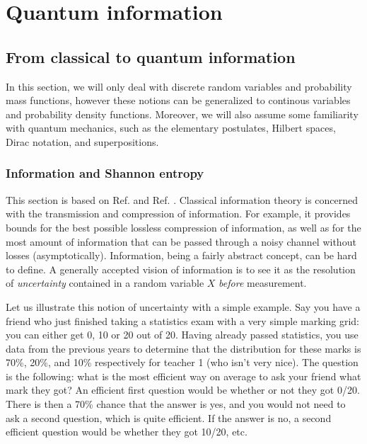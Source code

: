 \chapter{Quantum information} \label{chap:quantum_information}

\section{From classical to quantum information} \label{sec:classical_information}

In this section, we will only deal with discrete random variables and probability mass functions, however these notions can be generalized to continous variables and probability density functions. Moreover, we will also assume some familiarity with quantum mechanics, such as the elementary postulates, Hilbert spaces, Dirac notation, and superpositions.



\subsection{Information and Shannon entropy}

This section is based on Ref. \cite[pp. 1--56]{cover_elements_2006} and Ref. \cite[pp. 500--506]{nielsen_quantum_2010}. Classical information theory is concerned with the transmission and compression of information. For example, it provides bounds for the best possible lossless compression of information, as well as for the most amount of information that can be passed through a noisy channel without losses (asymptotically). Information, being a fairly abstract concept, can be hard to define. A generally accepted vision of information is to see it as the resolution of \textit{uncertainty} contained in a random variable $X$ \textit{before} measurement.

Let us illustrate this notion of uncertainty with a simple example. Say you have a friend who just finished taking a statistics exam with a very simple marking grid: you can either get 0, 10 or 20 out of 20. Having already passed statistics, you use data from the previous years to determine that the distribution for these marks is 70\%, 20\%, and 10\% respectively for teacher 1 (who isn't very nice). The question is the following: what is the most efficient way on average to ask your friend what mark they got? An efficient first question would be whether or not they got 0/20. There is then a 70\% chance that the answer is yes, and you would not need to ask a second question, which is quite efficient. If the answer is no, a second efficient question would be whether they got 10/20, etc.

